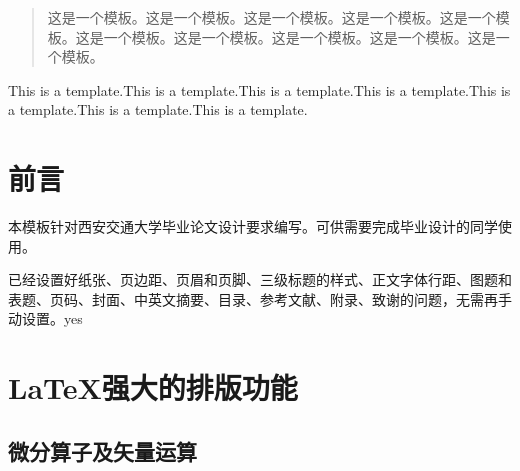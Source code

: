 \documentclass[bachelor]{XJTUthesis}
\begin{document}
\cover


\tableofcontents
\thispagestyle{empty}
\setcounter{page}{0}
\newpage

\begin{abstract}
    这是一个模板。这是一个模板。这是一个模板。这是一个模板。这是一个模板。这是一个模板。这是一个模板。这是一个模板。这是一个模板。这是一个模板。\cite{成永红2001电力设备绝缘检测与诊断}
\end{abstract}
\newpage
\begin{eabstract}
    This is a template.This is a template.This is a template.This is a template.This is a template.This is a template.This is a template.
\end{eabstract}

\chapter{前言}
本模板针对西安交通大学毕业论文设计要求编写。可供需要完成毕业设计的同学使用。\par
已经设置好纸张、页边距、页眉和页脚、三级标题的样式、正文字体行距、图题和表题、页码、封面、中英文摘要、目录、参考文献、附录、致谢的问题，无需再手动设置。yes

\chapter{\LaTeX 强大的排版功能}
\section{微分算子及矢量运算}
\end{document}
